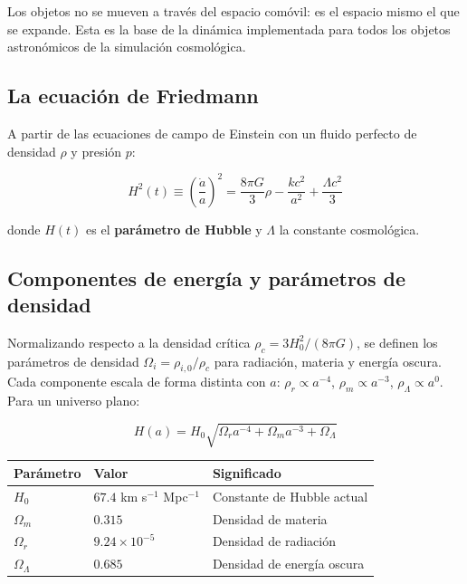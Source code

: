 \documentclass[12pt, a4paper]{article}
\begin{document}
Los objetos no se mueven a través del espacio comóvil: es el espacio
mismo el que se expande. Esta es la base de la dinámica implementada
para todos los objetos astronómicos de la simulación cosmológica.

\subsection{La ecuación de Friedmann}

A partir de las ecuaciones de campo de Einstein con un fluido perfecto
de densidad $\rho$ y presión $p$:

\begin{equation}
  H^2(t) \equiv \left(\frac{\dot a}{a}\right)^2
  = \frac{8\pi G}{3}\rho - \frac{kc^2}{a^2} + \frac{\Lambda c^2}{3}
  \label{eq:friedmann1}
\end{equation}

donde $H(t)$ es el \textbf{parámetro de Hubble} y $\Lambda$ la
constante cosmológica.

\subsection{Componentes de energía y parámetros de densidad}

Normalizando respecto a la densidad crítica
$\rho_c = 3H_0^2/(8\pi G)$, se definen los parámetros de densidad
$\Omega_i = \rho_{i,0}/\rho_c$ para radiación, materia y energía
oscura. Cada componente escala de forma distinta con $a$:
$\rho_r \propto a^{-4}$, $\rho_m \propto a^{-3}$,
$\rho_\Lambda \propto a^0$. Para un universo plano:

\begin{equation}
  \boxed{\;
  H(a) = H_0\sqrt{\Omega_r a^{-4} + \Omega_m a^{-3} + \Omega_\Lambda}
  \;}
  \label{eq:hubble_a}
\end{equation}

\begin{center}
\begin{tabular}{@{}lll@{}}
\toprule
Parámetro & Valor & Significado \\
\midrule
$H_0$ & $67.4$ km s$^{-1}$ Mpc$^{-1}$ & Constante de Hubble actual \\
$\Omega_m$ & $0.315$ & Densidad de materia \\
$\Omega_r$ & $9.24\times10^{-5}$ & Densidad de radiación \\
$\Omega_\Lambda$ & $0.685$ & Densidad de energía oscura \\
\bottomrule
\end{tabular}
\end{center}
\end{document}

